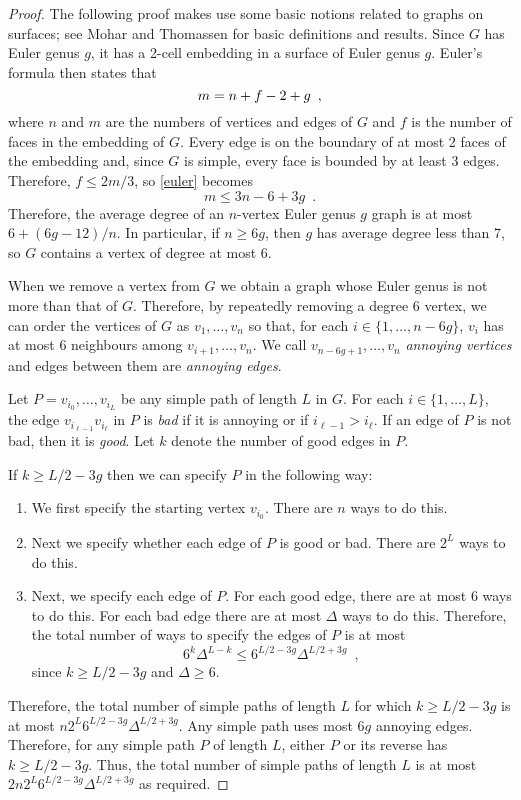 \documentclass[lotsofwhite]{patmorin}
\begin{document}
\begin{proof}
   The following proof makes use some basic notions related to graphs
   on surfaces; see Mohar and Thomassen \cite{mohar.thomassen:graphs} for basic
   definitions and results.
   Since $G$ has Euler genus $g$, it has a 2-cell embedding in a surface
   of Euler genus $g$.  Euler's formula then states that 
   \begin{equation}
      m = n+f-2+g \enspace ,  \eqlabel{euler}
   \end{equation}
   where $n$ and $m$ are the numbers of vertices and edges of
   $G$ and $f$ is the number of faces in the embedding of $G$.  
   Every edge is on the boundary of at most 2 faces of the embedding
   and, since $G$ is simple, 
   every face is
   bounded by at least 3 edges.  Therefore, $f \le 2m/3$, so \eqref{euler}
   becomes
   \[
       m\le 3n-6+3g \enspace .
   \]
   Therefore, the average degree of an $n$-vertex Euler genus $g$ graph
   is at most $6+(6g-12)/n$.  In particular, if $n \ge 6g$, then $g$
   has average degree less than 7, so $G$ contains a vertex of degree
   at most $6$.
  
   When we remove a vertex from $G$ we obtain a graph whose Euler genus is
   not more than that of $G$.  Therefore, by repeatedly removing a degree
   6 vertex, we can order the vertices of $G$ as $v_1,\ldots,v_n$ so that,
   for each $i\in\{1,\ldots,n-6g\}$, $v_i$ has at most 6 neighbours among
   $v_{i+1},\ldots,v_n$.  We call $v_{n-6g+1},\ldots,v_n$ \emph{annoying
   vertices} and edges between them are \emph{annoying edges}.

   Let $P=v_{i_0},\ldots,v_{i_L}$ be any simple path of length $L$ in $G$.
   For each $i\in\{1,\ldots,L\}$, the edge $v_{i_{\ell-1}}v_{i_{\ell}}$
   in $P$ is \emph{bad} if it is annoying or if $i_{\ell-1}>i_{\ell}$. If
   an edge of $P$ is not bad, then it is \emph{good}.  Let $k$ denote
   the number of good edges in $P$.

   If $k\ge L/2-3g$ then we can specify $P$ in the following way:
   \begin{enumerate}
     \item We first specify the starting vertex $v_{i_0}$.  There are $n$
       ways to do this.
     \item Next we specify whether each edge of $P$ is good or bad.
       There are $2^L$ ways to do this.
     \item Next, we specify each edge of $P$.  For each good edge,
       there are at most 6 ways to do this. For each bad edge there are 
       at most $\Delta$ ways to do this.
      Therefore, the total number of ways to specify the edges of $P$ is at most
      \[   6^k\Delta^{L-k} \le 6^{L/2-3g}\Delta^{L/2+3g}  \enspace ,\]
      since $k\ge L/2-3g$ and $\Delta\ge 6$.
   \end{enumerate}
   Therefore, the total number of simple paths of length $L$ for which
   $k\ge L/2-3g$ is at most $n2^L6^{L/2-3g}\Delta^{L/2+3g}$.  Any simple
   path uses most $6g$ annoying edges.  Therefore, for any simple path
   $P$ of length $L$, either $P$ or its reverse has $k\ge L/2-3g$.
   Thus, the total number of simple paths of length $L$ is at most
   $2n2^L6^{L/2-3g}\Delta^{L/2+3g}$ as required.  



\end{proof}
\end{document}
